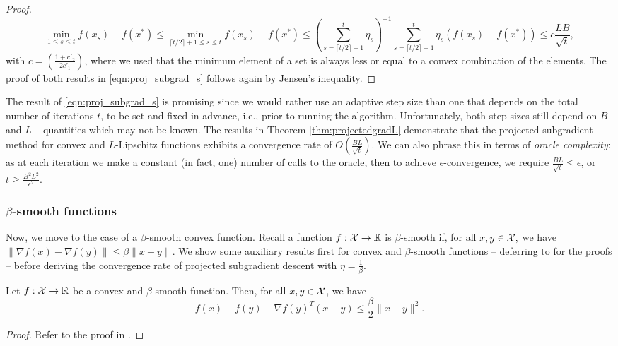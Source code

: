 \begin{theorem}
\begin{proof}
\[
\min_{1 \leq s \leq t} f(x_s) - f(x^*) \leq \min_{\lceil t /2 \rceil + 1 \leq s \leq t} f(x_s) - f(x^*) \leq \left(\sum_{s=\lceil t /2 \rceil + 1}^t \eta_s\right)^{-1}\sum_{s=\lceil t /2 \rceil + 1}^t \eta_s \left(f(x_s) - f(x^*)\right) \leq c\frac{LB}{\sqrt{t}},
\]
with $c=\left( \frac{1+c'_2}{2c'_1} \right)$, where we used that the minimum element of a set is always less or equal to a convex combination of the elements. The proof of both results in \eqref{eqn:proj_subgrad_s} follows again by Jensen's inequality.
\end{proof}
\end{theorem}

The result of \eqref{eqn:proj_subgrad_s} is promising since we would rather use an adaptive step size than one that depends on the total number of iterations $t$, to be set and fixed in advance, i.e., prior to running the algorithm. Unfortunately, both step sizes still depend on $B$ and $L$ -- quantities which may not be known. The results in Theorem \ref{thm:projectedgradL} demonstrate that the projected subgradient method for convex and $L$-Lipschitz functions exhibits a convergence rate of $O\left(\frac{BL}{\sqrt{t}}\right)$. We can also phrase this in terms of \emph{oracle complexity}: as at each iteration we make a constant (in fact, one) number of calls to the oracle, then to achieve $\epsilon$-convergence, we require $\frac{BL}{\sqrt{t}} \le \epsilon$, or $t\geq \frac{B^2 L^2}{\epsilon^2}$.

\subsubsection{$\beta$-smooth functions}
Now, we move to the case of a $\beta$-smooth convex function. Recall a function $f: \mathcal{X} \rightarrow \mathbb{R}$ is $\beta$-smooth if, for all $x,y \in \mathcal{X},$ we have $\| \nabla f(x) - \nabla f(y) \| \leq \beta \| x - y \|$. We show some auxiliary results first for convex and $\beta$-smooth functions -- deferring to \cite{bubeck} for the proofs -- before deriving the convergence rate of projected subgradient descent with $\eta = \frac{1}{\beta}$.

\begin{lemma} \label{lem:cvx_beta_smooth}
Let $f : \mathcal{X} \rightarrow \mathbb{R}$ be a convex and $\beta$-smooth function. Then, for all $x, y \in \mathcal{X}$, we have 
\[
f(x) - f(y) - \nabla f(y)^T (x - y) \leq \frac{\beta}{2} \| x - y \|^2.
\]
\begin{proof}
Refer to the proof in \cite[Lemma~3.4]{bubeck}.
\end{proof}
\end{lemma} 

